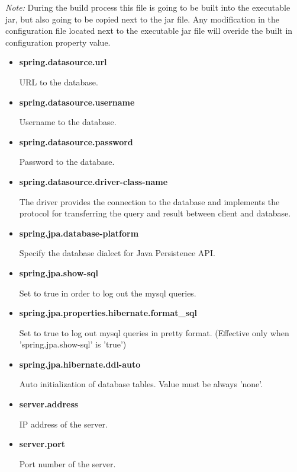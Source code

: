 \documentclass[a4paper]{arrowhead}
\begin{document}
\textit{Note:} During the build process this file is going to be built into the executable jar, but also going to be copied next to the jar file. Any modification in the configuration file located next to the executable jar file will overide the built in configuration property value.
  \begin{itemize}
  \item \textbf{spring.datasource.url}
  
   URL to the database.
  
  \item \textbf{spring.datasource.username}
  
  Username to the database.
  
  \item \textbf{spring.datasource.password}
  
  Password to the database.
  
  \item \textbf{spring.datasource.driver-class-name}
  
  The driver provides the connection to the database and implements the protocol for transferring the query and result between client and database.
  
  \item \textbf{spring.jpa.database-platform}
  
  Specify the database dialect for Java Persistence API.
  
  \item \textbf{spring.jpa.show-sql}
  
  Set to true in order to log out the mysql queries.
  
  \item \textbf{spring.jpa.properties.hibernate.format\_sql}
  
  Set to true to log out mysql queries in pretty format. (Effective only when 'spring.jpa.show-sql' is 'true')
  
  \item \textbf{spring.jpa.hibernate.ddl-auto}
  
  Auto initialization of database tables. Value must be always 'none'.
  
  \item \textbf{server.address}
  
  IP address of the server.
  
  \item \textbf{server.port}
  
  Port number of the server.
  

\end{itemize}
\end{document}
